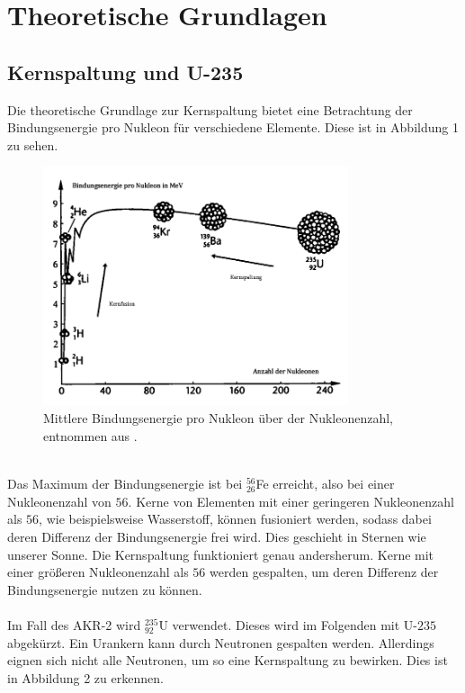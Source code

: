 \documentclass[german,  %
parskip=full,  %
]{scrartcl}
\begin{document}
\section{Theoretische Grundlagen}
\subsection{Kernspaltung und U-235}
Die theoretische Grundlage zur Kernspaltung bietet eine Betrachtung der Bindungsenergie pro Nukleon für verschiedene Elemente. Diese ist in Abbildung 1 zu sehen.
\\
\begin{figure}[h!]\centering
\includegraphics[width=0.8\textwidth]{bindungsenergie}
\caption{Mittlere Bindungsenergie pro Nukleon über der Nukleonenzahl, entnommen aus \cite{bindungsenergie}.}
\end{figure}
\\
Das Maximum der Bindungsenergie ist bei $^{56}_{26}$Fe erreicht, also bei einer Nukleonenzahl von $56$. Kerne von Elementen mit einer geringeren Nukleonenzahl als $56$, wie beispielsweise Wasserstoff, können fusioniert werden, sodass dabei deren Differenz der Bindungsenergie frei wird. Dies geschieht in Sternen wie unserer Sonne. Die Kernspaltung funktioniert genau andersherum. Kerne mit einer größeren Nukleonenzahl als $56$ werden gespalten, um deren Differenz der Bindungsenergie nutzen zu können.
\\\\
Im Fall des AKR-2 wird $^{235}_{92}$U verwendet. Dieses wird im Folgenden mit U-$235$ abgekürzt. Ein Urankern kann durch Neutronen gespalten werden. Allerdings eignen sich nicht alle Neutronen, um so eine Kernspaltung zu bewirken. Dies ist in Abbildung 2 zu erkennen.
\\\\
\end{document}
